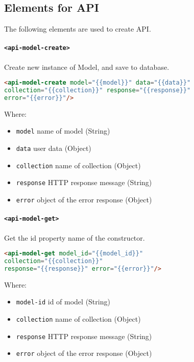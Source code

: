 \subsection{Elements for API}

The following elements are used to create API.

\paragraph{\texttt{<api-model-create>}}

Create new instance of Model, and save to database.

\begin{lstlisting}[language=html]
<api-model-create model="{{model}}" data="{{data}}" 
collection="{{collection}}" response="{{response}}" 
error="{{error}}"/>
\end{lstlisting}
Where:
\begin{itemize}
\item \texttt{model} name of model (String)
\item \texttt{data} user data (Object)
\item \texttt{collection} name of collection (Object)
\item \texttt{response}	HTTP response message (String)
\item \texttt{error} object of the error response (Object)
\end{itemize}

\paragraph{\texttt{<api-model-get>}}

Get the id property name of the constructor.

\begin{lstlisting}[language=html]
<api-model-get model_id="{{model_id}}" 
collection="{{collection}}" 
response="{{response}}" error="{{error}}"/>
\end{lstlisting}
Where:
\begin{itemize}
\item \texttt{model-id} id of model (String)
\item \texttt{collection} name of collection (Object)
\item \texttt{response}	HTTP response message (String)
\item \texttt{error} object of the error response (Object)
\end{itemize}

